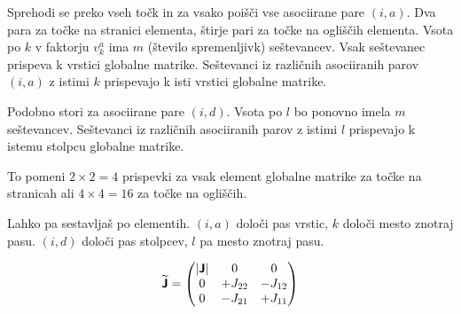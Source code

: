 Sprehodi se preko vseh točk in za vsako poišči vse asociirane pare $(i, a)$. Dva para za točke na stranici elementa, štirje pari za točke na ogliščih elementa. Vsota po $k$ v faktorju $v^a_k$ ima $m$ (število spremenljivk) seštevancev. Vsak seštevanec prispeva k vrstici globalne matrike. Seštevanci iz različnih asociiranih parov $(i, a)$ z istimi $k$ prispevajo k isti vrstici globalne matrike.

Podobno stori za asociirane pare $(i, d)$. Vsota po $l$ bo ponovno imela $m$ seštevancev. Seštevanci iz različnih asociiranih parov z istimi $l$ prispevajo k istemu stolpcu globalne matrike.

To pomeni \(2 \times 2 = 4\) prispevki za vsak element globalne matrike za točke na stranicah ali $4 \times 4 = 16$ za točke na ogliščih.

Lahko pa sestavljaš po elementih. $(i, a)$ določi pas vrstic, $k$ določi mesto znotraj pasu. $(i, d)$ določi pas stolpcev, $l$ pa mesto znotraj pasu.

\begin{equation}
   \bm{\mathsf{\widetilde{J}}}
   =
   \begin{pmatrix}
      |\bm{\mathsf{J}}| & 0 & 0 \\
      0 & +J_{22} & -J_{12} \\
      0 & -J_{21} & +J_{11}
   \end{pmatrix}
\end{equation}